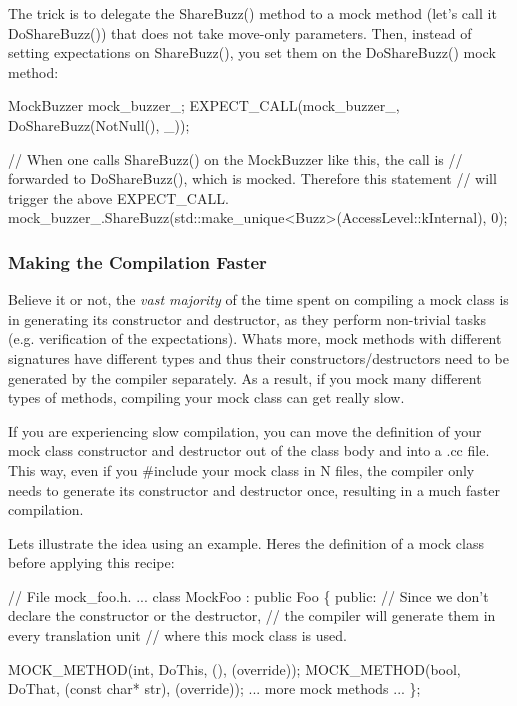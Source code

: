 The trick is to delegate the {\ttfamily Share\+Buzz()} method to a mock method (let’s call it {\ttfamily Do\+Share\+Buzz()}) that does not take move-\/only parameters. Then, instead of setting expectations on {\ttfamily Share\+Buzz()}, you set them on the {\ttfamily Do\+Share\+Buzz()} mock method\+:


\begin{DoxyCode}
MockBuzzer mock\_buzzer\_;
EXPECT\_CALL(mock\_buzzer\_, DoShareBuzz(NotNull(), \_));

\textcolor{comment}{// When one calls ShareBuzz() on the MockBuzzer like this, the call is}
\textcolor{comment}{// forwarded to DoShareBuzz(), which is mocked.  Therefore this statement}
\textcolor{comment}{// will trigger the above EXPECT\_CALL.}
mock\_buzzer\_.ShareBuzz(std::make\_unique<Buzz>(AccessLevel::kInternal), 0);
\end{DoxyCode}


\subsubsection*{Making the Compilation Faster}

Believe it or not, the {\itshape vast majority} of the time spent on compiling a mock class is in generating its constructor and destructor, as they perform non-\/trivial tasks (e.\+g. verification of the expectations). What\textquotesingle{}s more, mock methods with different signatures have different types and thus their constructors/destructors need to be generated by the compiler separately. As a result, if you mock many different types of methods, compiling your mock class can get really slow.

If you are experiencing slow compilation, you can move the definition of your mock class\textquotesingle{} constructor and destructor out of the class body and into a {\ttfamily .cc} file. This way, even if you {\ttfamily \#include} your mock class in N files, the compiler only needs to generate its constructor and destructor once, resulting in a much faster compilation.

Let\textquotesingle{}s illustrate the idea using an example. Here\textquotesingle{}s the definition of a mock class before applying this recipe\+:


\begin{DoxyCode}
\textcolor{comment}{// File mock\_foo.h.}
...
class MockFoo : \textcolor{keyword}{public} Foo \{
 \textcolor{keyword}{public}:
  \textcolor{comment}{// Since we don't declare the constructor or the destructor,}
  \textcolor{comment}{// the compiler will generate them in every translation unit}
  \textcolor{comment}{// where this mock class is used.}

  MOCK\_METHOD(\textcolor{keywordtype}{int}, DoThis, (), (\textcolor{keyword}{override}));
  MOCK\_METHOD(\textcolor{keywordtype}{bool}, DoThat, (\textcolor{keyword}{const} \textcolor{keywordtype}{char}* str), (\textcolor{keyword}{override}));
  ... more mock methods ...
\};
\end{DoxyCode}


